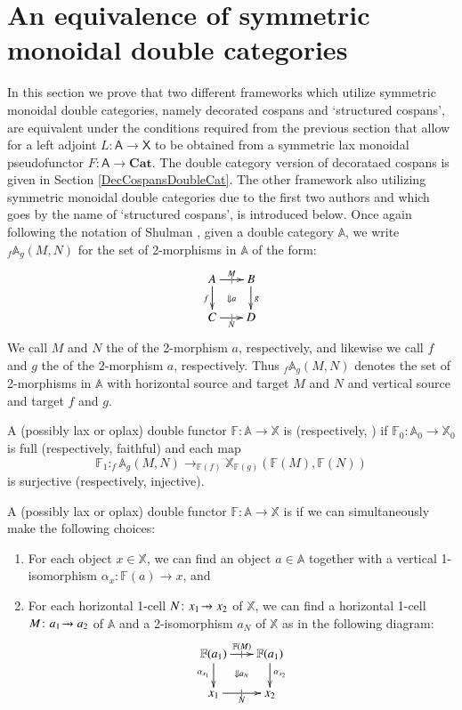 \documentclass{amsart}
\begin{document}
\section{An equivalence of symmetric monoidal double categories} \label{EquivDoubleCats}
In this section we prove that two different frameworks which utilize symmetric monoidal double categories, namely decorated cospans and `structured cospans', are equivalent under the conditions required from the previous section that allow for a left adjoint $L \colon \mathsf{A} \to \mathsf{X}$ to be obtained from a symmetric lax monoidal pseudofunctor $F \colon \mathsf{A} \to \mathbf{Cat}$. The double category version of decorataed cospans is given in Section \ref{DecCospansDoubleCat}. The other framework also utilizing symmetric monoidal double categories due to the first two authors and which goes by the name of `structured cospans', is introduced below. Once again following the notation of Shulman \cite{Shul2}, given a double category $\mathbb{A}$, we write $_f \mathbb{A}_g(M,N)$ for the set of 2-morphisms in $\mathbb{A}$ of the form:
\[
  \xymatrix@-.5pc{
    A \ar[r]|{|}^{M}  \ar[d]_f \ar@{}[dr]|{\Downarrow a}&
    B\ar[d]^g\\
    C \ar[r]|{|}_N & D
  }
\]
We call $M$ and $N$ the  of the 2-morphism $a$, respectively, and likewise we call $f$ and $g$ the  of the 2-morphism $a$, respectively. Thus $_f \mathbb{A}_g(M,N)$ denotes the set of 2-morphisms in $\mathbb{A}$ with horizontal source and target $M$ and $N$ and vertical source and target $f$ and $g$.
\begin{defn}
A (possibly lax or oplax) double functor $\mathbb{F} \colon \mathbb{A} \to \mathbb{X}$ is  (respectively, ) if $\mathbb{F}_0 \colon \mathbb{A}_0 \to \mathbb{X}_0$ is full (respectively, faithful) and each map $$\mathbb{F}_1 \colon _f \mathbb{A}_g(M,N) \to _{\mathbb{F}(f)} \mathbb{X}_{\mathbb{F}(g)}(\mathbb{F}(M),\mathbb{F}(N))$$ is surjective (respectively, injective).
\end{defn}
\begin{defn}
A (possibly lax or oplax) double functor $\mathbb{F} \colon \mathbb{A} \to \mathbb{X}$ is  if we can simultaneously make the following choices:
\begin{enumerate}
\item{For each object $x \in \mathbb{X}$, we can find an object $a \in \mathbb{A}$ together with a vertical 1-isomorphism $\alpha_x \colon \mathbb{F}(a) \to x$, and}
\item{For each horizontal 1-cell $N \colon x_1 \tobar x_2$  of $\mathbb{X}$, we can find a horizontal 1-cell $M \colon a_1 \tobar a_2$ of $\mathbb{A}$ and a 2-isomorphism $a_{N}$ of $\mathbb{X}$ as in the following diagram:
\[
  \xymatrix@-.5pc{
    \mathbb{F}(a_1) \ar[r]|{|}^{\mathbb{F}(M)}  \ar[d]_{\alpha_{x_1}} \ar@{}[dr]|{\Downarrow a_N}&
    \mathbb{F}(a_1) \ar[d]^{\alpha_{x_2}}\\
    x_1 \ar[r]|{|}_N & x_2
  }
\]
}
\end{enumerate}
\end{defn}
\end{document}
